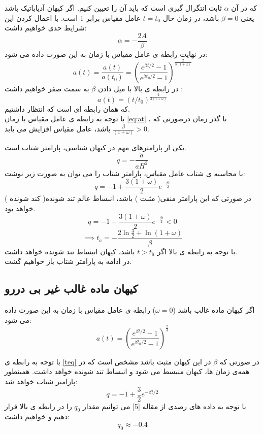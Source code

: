 \documentclass[12pt]{article}
\begin{document}
که در آن $\alpha$ ثابت انتگرال گیری است که باید آن را تعیین کنیم. اگر کیهان آدیاباتیک باشد یعنی $\beta=0$ باشد، در زمان حال $t=t_0$ عامل مقیاس برابر 1 است.
با اعمال کردن این شرایط حدی خواهیم داشت:
$$\alpha=-\frac{2A}{\beta}$$
در نهایت رابطه ی عامل مقیاس با زمان به این صورت داده می شود:
\begin{equation}\label{eq:at}
a(t)=\frac{a(t)}{a(t_0)}=\left(\frac{e^{\beta t/2}-1}{e^{\beta t_0/2}-1}\right)^{\frac{2}{3(1+\omega)}}
\end{equation}
در رابطه ی بالا با میل دادن $\beta$ به سمت صفر خواهیم داشت :
$$a(t)=(t/t_0)^{\frac{2}{3(1+\omega)}}$$
که همان رابطه ای است که انتظار داشتیم.\\
با توجه به رابطه ی عامل مقیاس با زمان
\eqref{eq:at}
، با گذر زمان درصورتی که $\frac{\beta}{(1+\omega)}>0$ باشد، عامل مقیاس افزایش می یابد.

یکی از پارامترهای مهم در کیهان شناسی، پارامتر شتاب است.
\begin{equation}
q=-\frac{\ddot a}{aH^2}
\end{equation}
با محاسبه ی شتاب عامل مقیاس، پارامتر شتاب را می توان به صورت زیر نوشت:
\begin{equation}
q=-1+\frac{3(1+\omega)}{2}e^{-\frac{\beta t}{2}}
\end{equation}
در صورتی که این پارامتر منفی( مثبت ) باشد، انبساط عالم تند شونده( کند شونده ) خواهد بود.
\begin{equation}
q=-1+\frac{3(1+\omega)}{2}e^{-\frac{\beta t}{2}}<0
\end{equation}
\begin{equation}\label{teq}
\implies t_{\ddot a}=-\frac{2\ln{\frac{3}{2}}+\ln(1+\omega)}{\beta}
\end{equation}
با توجه به رابطه ی بالا اگر
 $t>t_{\ddot a}$ 
باشد، کیهان انبساط تند شونده خواهد داشت.\\
در ادامه به پارامتر شتاب باز خواهیم گشت.

\subsection{کیهان ماده غالب غیر بی دررو}
اگر کیهان ماده غالب باشد ($\omega=0$) رابطه ی عامل مقیاس با زمان به این صورت داده می شود:
\begin{equation}\label{eq:a}
a(t)=\left(\frac{e^{\beta t/2}-1}{e^{\beta t_0/2}-1}\right)^{\frac{2}{3}}
\end{equation}

با توجه به رابطه ی 
\eqref{teq}
در صورتی که $\beta$ در این کیهان مثبت باشد مشخص است که در همه‌ی زمان ها، کیهان منبسط می شود و انبساط تند شونده خواهد داشت.
همینطور پارامتر شتاب خواهد شد:
\begin{equation}
q=-1+\frac{3}{2}e^{-\beta t/2}
\end{equation}
با توجه به داده های رصدی از مقاله [5] می توانیم مقدار $q_0$ را در رابطه ی بالا قرار دهیم و خواهیم داشت:
$$q_0\approx -0.4$$
\end{document}
